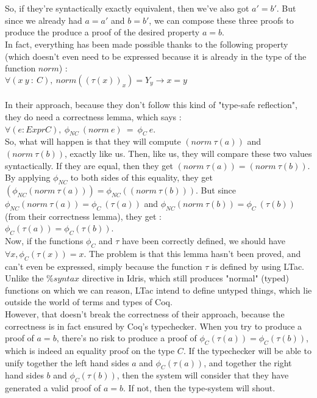\documentclass{llncs}
\begin{document}
\\
\\
So, if they're syntactically exactly equivalent, then we've also got $a'=b'$. But since we already had $a=a'$ and $b=b'$, we can compose these three proofs to produce the produce a proof of the desired property $a=b$. 
\\
In fact, everything has been made possible thanks to the following property (which doesn't even need to be expressed because it is already in the type of the function $norm$) : \\
$\forall (x\ y\ :\ C),\ norm ((\tau(x))_x) = Y_y \rightarrow x = y$
\\
\\
In their approach, because they don't follow this kind of "type-safe reflection", they do need a correctness lemma, which says : \\
$\forall (e:ExprC),\ \phi_{NC}\ (norm\ e)\ =\ \phi_C\ e$. \\
So, what will happen is that they will compute $(norm\ \tau(a))$ and $(norm\ \tau(b))$, exactly like us. 
Then, like us, they will compare these two values syntactically. If they are equal, then they get
$(norm\ \tau(a)) = (norm\ \tau(b))$. By applying $\phi_{NC}$ to both sides of this equality, they get $(\phi_{NC} (norm\ \tau(a))) = \phi_{NC} ((norm\ \tau(b)))$. But since $\phi_{NC} (norm\ \tau(a)) = \phi_C\ (\tau(a))$ and $\phi_{NC} (norm\ \tau(b)) = \phi_C\ (\tau(b))$ (from their correctness lemma), they get : \\
$\phi_C (\tau(a)) = \phi_C (\tau(b))$. \\
Now, if the functions $\phi_C$ and $\tau$ have been correctly defined, we should have $\forall x, \phi_C (\tau(x)) = x$. The problem is that this lemma hasn't been proved, and can't even be expressed, simply because the function $\tau$ is defined by using LTac. Unlike the $\%syntax$ directive in Idris, which still produces "normal" (typed) functions on which we can reason, LTac intend to define untyped things, which lie outside the world of terms and types of Coq.
\\
However, that doesn't break the correctness of their approach, because the correctness is in fact ensured by Coq's typechecker. When you try to produce a proof of $a=b$, there's no risk to produce a proof of $\phi_C (\tau(a)) = \phi_C (\tau(b))$, which is indeed an equality proof on the type $C$. If the typechecker will be able to unify together the left hand sides $a$ and $\phi_C (\tau(a))$, and together the right hand sides $b$ and $\phi_C (\tau(b))$, then the system will consider that they have generated a valid proof of $a=b$. If not, then the type-system will shout.
\end{document}
